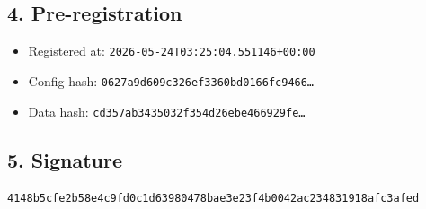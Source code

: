 \documentclass{article}
\begin{document}
\subsection*{4. Pre-registration}
\begin{itemize}
\item Registered at: \texttt{2026-05-24T03:25:04.551146+00:00}
\item Config hash: \texttt{0627a9d609c326ef3360bd0166fc9466\dots}
\item Data hash: \texttt{cd357ab3435032f354d26ebe466929fe\dots}
\end{itemize}
\subsection*{5. Signature}
\texttt{4148b5cfe2b58e4c9fd0c1d63980478bae3e23f4b0042ac234831918afc3afed}\\
\end{document}
